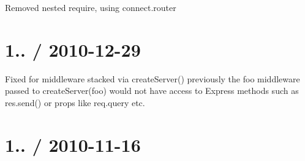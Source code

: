 {\ttfamily }

{\ttfamily 
\begin{DoxyItemize}
\item Removed nested require, using {\ttfamily connect.\+router}
\end{DoxyItemize}}

{\ttfamily \section*{1.. / 2010-\/12-\/29 }}

{\ttfamily }

{\ttfamily 
\begin{DoxyItemize}
\item Fixed for middleware stacked via {\ttfamily create\+Server()} previously the {\ttfamily foo} middleware passed to {\ttfamily create\+Server(foo)} would not have access to Express methods such as {\ttfamily res.\+send()} or props like {\ttfamily req.\+query} etc.
\end{DoxyItemize}}

{\ttfamily \section*{1.. / 2010-\/11-\/16 }}

{\ttfamily }

